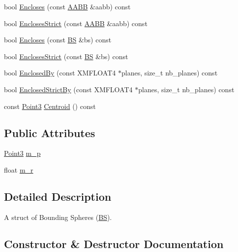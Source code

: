\begin{DoxyCompactItemize}
\item 
bool \hyperlink{structmage_1_1_b_s_af6139a592c9d95ae0f1162a9f2e485d1}{Encloses} (const \hyperlink{structmage_1_1_a_a_b_b}{A\+A\+BB} \&aabb) const
\item 
bool \hyperlink{structmage_1_1_b_s_a2114f30ef1fd41b0fdeab31c24a66b7a}{Encloses\+Strict} (const \hyperlink{structmage_1_1_a_a_b_b}{A\+A\+BB} \&aabb) const
\item 
bool \hyperlink{structmage_1_1_b_s_a60a9ed7cca1ffb815c43eafa7f5093b6}{Encloses} (const \hyperlink{structmage_1_1_b_s}{BS} \&bs) const
\item 
bool \hyperlink{structmage_1_1_b_s_ad1b81567c640283bd5355073dd0bf226}{Encloses\+Strict} (const \hyperlink{structmage_1_1_b_s}{BS} \&bs) const
\item 
bool \hyperlink{structmage_1_1_b_s_afa01cd31b15b2decdf5a3c5333e4c260}{Enclosed\+By} (const X\+M\+F\+L\+O\+A\+T4 $\ast$planes, size\+\_\+t nb\+\_\+planes) const
\item 
bool \hyperlink{structmage_1_1_b_s_ae4355ffb0d3f5109ad6ee2bea00a6eb9}{Enclosed\+Strict\+By} (const X\+M\+F\+L\+O\+A\+T4 $\ast$planes, size\+\_\+t nb\+\_\+planes) const
\item 
const \hyperlink{structmage_1_1_point3}{Point3} \hyperlink{structmage_1_1_b_s_adc96252cb4341dda8368a1f23bc4f972}{Centroid} () const
\end{DoxyCompactItemize}
\subsection*{Public Attributes}
\begin{DoxyCompactItemize}
\item 
\hyperlink{structmage_1_1_point3}{Point3} \hyperlink{structmage_1_1_b_s_a6d63fae8fd20d26587ebd11efb1789d2}{m\+\_\+p}
\item 
float \hyperlink{structmage_1_1_b_s_a7a783b2ad117fc19a1caf548e3033df6}{m\+\_\+r}
\end{DoxyCompactItemize}


\subsection{Detailed Description}
A struct of Bounding Spheres (\hyperlink{structmage_1_1_b_s}{BS}). 

\subsection{Constructor \& Destructor Documentation}
\hypertarget{structmage_1_1_b_s_aa34921d9ea23b9a724ddf739b3adabfa}{}\label{structmage_1_1_b_s_aa34921d9ea23b9a724ddf739b3adabfa} 
